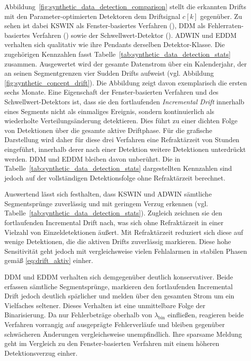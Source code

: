 Abbildung~\ref{fig:synthetic_data_detection_comparison} stellt die erkannten Drifts mit den Parameter-optimierten Detektoren dem Driftsignal $c[k]$ gegenüber. Zu sehen ist dabei \ac{KSWIN} als Fenster-basiertes Verfahren (), \ac{DDM} als Fehlerraten-basiertes Verfahren () sowie der Schwellwert-Detektor (). \ac{ADWIN} und \ac{EDDM} verhalten sich qualitativ wie ihre Pendants derselben Detektor-Klasse. Die zugehörigen Kennzahlen fasst Tabelle~\ref{tab:synthetic_data_detection_stats} zusammen. Ausgewertet wird der gesamte Datenstrom über ein Kalenderjahr, der an seinen Segmentgrenzen vier Sudden Drifts aufweist (vgl. Abbildung \ref{fig:synthetic_concept_drift}). Die Abbildung zeigt davon exemplarisch die ersten sechs Monate.
Eine Eigenschaft der Fenster-basierten Verfahren und des Schwellwert-Detektors ist, dass sie den fortlaufenden \emph{Incremental Drift} innerhalb eines Segments nicht als einmaliges Ereignis, sondern kontinuierlich als wiederholte Verteilungsänderung detektieren. Dies führt zu einer dichten Folge von Detektionen über die gesamte aktive Driftphase. Für die grafische Darstellung wird daher für diese drei Verfahren eine Refraktärzeit von \paramRefractH{} Stunden eingeführt, innerhalb derer nach einer Detektion weitere Detektionen unterdrückt werden. \ac{DDM} und \ac{EDDM} bleiben davon unberührt. Die in Tabelle~\ref{tab:synthetic_data_detection_stats} dargestellten Kennzahlen sind jedoch auf der vollständigen Detektionsfolge ohne Refraktärzeit berechnet. \par
%
Auswertend lässt sich festhalten, dass \ac{KSWIN} und \ac{ADWIN} sämtliche Segmentsprünge zuverlässig und mit geringem Verzug erkennen (vgl. Tabelle~\ref{tab:synthetic_data_detection_stats}). Zugleich zeichnen sie den fortlaufenden Incremental Drift nach, was sich ohne Refraktärzeit in einer Vielzahl von Einzeldetektionen äußert. Mit Refraktärzeit reduziert sich diese auf wenige Detektionen, die die aktiven Drifts zuverlässig markieren. Diese hohe Sensitivität geht jedoch mit vergleichsweise vielen Fehlalarmen in stabilen Phasen gemäß \eqref{eq:drift_aktiv} einher. \par
%
\ac{DDM} und \ac{EDDM} verhalten sich demgegenüber deutlich konservativer. Beide erfassen sämtliche Segmentsprünge, markieren den fortlaufenden Incremental Drift jedoch deutlich spärlicher und melden über den gesamten Strom um ein Vielfaches seltener. Dieses Verhalten ist eine unmittelbare Folge der Binarisierung. Da nur Fehlerbeträge oberhalb von $\lambda_{\mathrm{bin}}$ einfließen, reagieren beide Verfahren vorrangig auf ausgeprägte Fehlerverläufe und bleiben gegenüber schwächeren Änderungen vergleichsweise unempfindlich. Ihre sparsame Meldung geht im Vergleich zu den Fenster-basierten Verfahren mit einem höheren Detektionsverzug einher. \par
